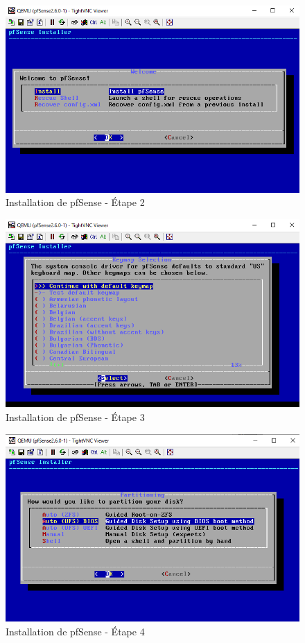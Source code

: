 \begin{figure}[H]
\centering
\includegraphics[width=15cm]{Images/BRadesMelian-Topologie3.png}
\caption{Installation de pfSense - Étape 2}
\label{Chap3.3.3}
\end{figure}

\begin{figure}[H]
\centering
\includegraphics[width=15cm]{Images/BRadesMelian-Topologie4.png}
\caption{Installation de pfSense - Étape 3}
\label{Chap3.3.4}
\end{figure}

\begin{figure}[H]
\centering
\includegraphics[width=15cm]{Images/BRadesMelian-Topologie5.png}
\caption{Installation de pfSense - Étape 4}
\label{Chap3.3.5}
\end{figure}


